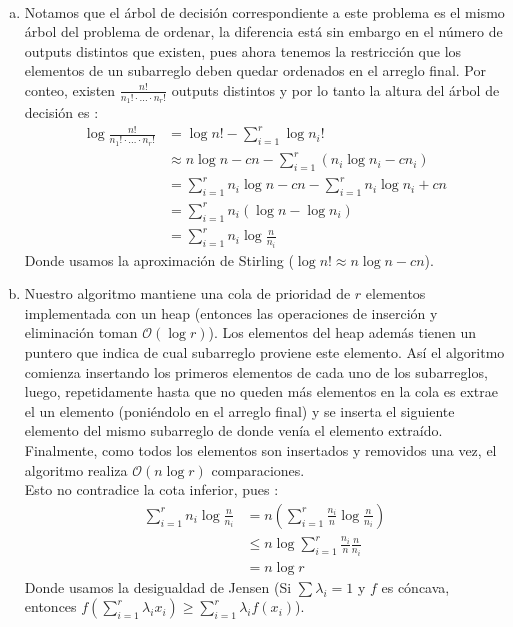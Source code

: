 \documentclass[dcc,uchile]{fcfmcourse}
\theoremstyle{plain}
\theoremstyle{definition}
\begin{document}
\newpage
\begin{problems}
\\
\begin{enumerate}[a)]
    \item Notamos que el árbol de decisión correspondiente a este problema es el mismo árbol del problema de ordenar, la diferencia está sin embargo en el número de outputs distintos que existen, pues ahora tenemos la restricción que los elementos de un subarreglo deben quedar ordenados en el arreglo final. Por conteo, existen $\frac{n!}{n_{1}!\cdot \ldots \cdot n_{r}!}$ outputs distintos y por lo tanto la altura del árbol de decisión es :
\begin{align*}
    \log{\frac{n!}{n_{1}!\cdot \ldots \cdot n_{r}!}} &= \log{n!} - \sum_{i=1}^r \log{n_{i}!} \\
    &\approx n\log{n}  - cn - \sum_{i=1}^r{\left(n_{i}\log{n_{i}} - cn_{i}\right)} \\
    &= \sum_{i=1}^{r} n_{i}\log{n} - cn - \sum_{i=1}^r n_{i}\log{n_{i}} + cn \\
    &= \sum_{i=1}^{r}n_{i}\left(\log{n} - \log{n_{i}}\right) \\
    &= \sum_{i = 1}^r{n_i\log{\frac{n}{n_{i}}}}
\end{align*}
    Donde usamos la aproximación de Stirling ($\log{n!} \approx n\log{n} - cn$).
    
    \item Nuestro algoritmo mantiene una cola de prioridad de $r$ elementos implementada con un heap (entonces las operaciones de inserción y eliminación toman $\mathcal{O}(\log{r})$). Los elementos del heap además tienen un puntero que indica de cual subarreglo proviene este elemento. Así el algoritmo comienza insertando los primeros elementos de cada uno de los subarreglos, luego, repetidamente hasta que no queden más elementos en la cola es extrae el un elemento (poniéndolo en el arreglo final) y se inserta el siguiente elemento del mismo subarreglo de donde venía el elemento extraído.\\
    Finalmente, como todos los elementos son insertados y removidos una vez, el algoritmo realiza $\mathcal{O}(n\log{r})$ comparaciones.\\
    
    Esto no contradice la cota inferior, pues :
    \begin{align*}
        \sum_{i = 1}^r{n_i\log{\frac{n}{n_{i}}}} &= n \left(\sum_{i = 1}^r{\frac{n_i}{n}\log{\frac{n}{n_{i}}}}\right) \\
        & \le n\log{\sum_{i = 1}^r\frac{n_{i}}{n}\frac{n}{n_{i}}}\\
        &= n\log{r}
    \end{align*}
    Donde usamos la desigualdad de Jensen (Si $\sum \lambda_i = 1$ y $f$ es cóncava, entonces $f\left(\sum_{i=1}^r \lambda_{i} x_{i}\right)\ge \sum_{i=1}^r \lambda_{i} f(x_{i})$).
\end{enumerate}


\end{problems}
\end{document}

